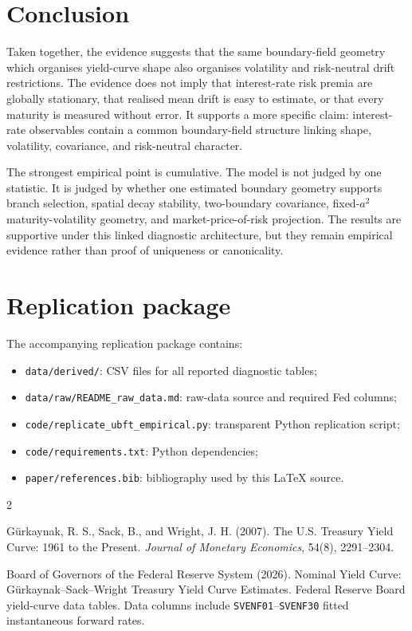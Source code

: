 \documentclass[11pt]{article}
\numberwithin{equation}{section}
\begin{document}
\section{Conclusion}
Taken together, the evidence suggests that the same boundary-field geometry which organises yield-curve shape also organises volatility and risk-neutral drift restrictions. The evidence does not imply that interest-rate risk premia are globally stationary, that realised mean drift is easy to estimate, or that every maturity is measured without error. It supports a more specific claim: interest-rate observables contain a common boundary-field structure linking shape, volatility, covariance, and risk-neutral character.

The strongest empirical point is cumulative. The model is not judged by one statistic. It is judged by whether one estimated boundary geometry supports branch selection, spatial decay stability, two-boundary covariance, fixed-$a^2$ maturity-volatility geometry, and market-price-of-risk projection. The results are supportive under this linked diagnostic architecture, but they remain empirical evidence rather than proof of uniqueness or canonicality.

\appendix
\section{Replication package}
The accompanying replication package contains:
\begin{itemize}[leftmargin=2em]
\item \texttt{data/derived/}: CSV files for all reported diagnostic tables;
\item \texttt{data/raw/README\_raw\_data.md}: raw-data source and required Fed columns;
\item \texttt{code/replicate\_ubft\_empirical.py}: transparent Python replication script;
\item \texttt{code/requirements.txt}: Python dependencies;
\item \texttt{paper/references.bib}: bibliography used by this LaTeX source.
\end{itemize}


\begin{thebibliography}{2}

G{\"u}rkaynak, R. S., Sack, B., and Wright, J. H. (2007).
\newblock The U.S. Treasury Yield Curve: 1961 to the Present.
\newblock \emph{Journal of Monetary Economics}, 54(8), 2291--2304.

Board of Governors of the Federal Reserve System (2026).
\newblock Nominal Yield Curve: G{\"u}rkaynak--Sack--Wright Treasury Yield Curve Estimates.
\newblock Federal Reserve Board yield-curve data tables. Data columns include \texttt{SVENF01}--\texttt{SVENF30} fitted instantaneous forward rates.

\end{thebibliography}
\end{document}

